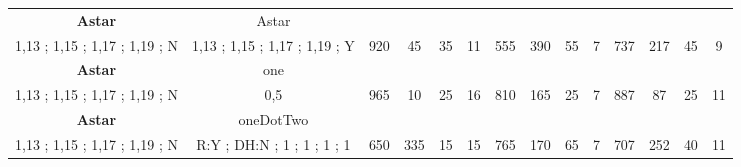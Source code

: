 \begin{table}[]
{\begin{tabular}{|c|c|c|c|c|c|c|c|c|c|c|c|c|c|}
\cellcolor{blue!15}\textbf{Astar} & Astar& {\color[HTML]{00009B} } & {\color[HTML]{9A0000} } & {\color[HTML]{009901} } &  & {\color[HTML]{00009B} } & {\color[HTML]{9A0000} } & {\color[HTML]{009901} } &  & {\color[HTML]{00009B} } & {\color[HTML]{9A0000} } & {\color[HTML]{009901} } &  \\ 
\cellcolor{ blue!15}1,13 ; 1,15 ; 1,17 ; 1,19 ; N & 1,13 ; 1,15 ; 1,17 ; 1,19 ; Y & \multirow{-2}{*}{{\color[HTML]{00009B} 920}} & \multirow{-2}{*}{{\color[HTML]{9A0000} 45}} & \multirow{-2}{*}{{\color[HTML]{009901} 35}} & \multirow{-2}{*}{11} & \multirow{-2}{*}{{\color[HTML]{00009B} 555}} & \multirow{-2}{*}{{\color[HTML]{9A0000} 390}} & \multirow{-2}{*}{{\color[HTML]{009901} 55}} & \multirow{-2}{*}{7} & \multirow{-2}{*}{{\color[HTML]{00009B} 737}} & \multirow{-2}{*}{{\color[HTML]{9A0000} 217}} & \multirow{-2}{*}{{\color[HTML]{009901} 45}} & \multirow{-2}{*}{9} \\ \hline

\cellcolor{blue!15}\textbf{Astar} & one& {\color[HTML]{00009B} } & {\color[HTML]{9A0000} } & {\color[HTML]{009901} } &  & {\color[HTML]{00009B} } & {\color[HTML]{9A0000} } & {\color[HTML]{009901} } &  & {\color[HTML]{00009B} } & {\color[HTML]{9A0000} } & {\color[HTML]{009901} } &  \\ 
\cellcolor{ blue!15}1,13 ; 1,15 ; 1,17 ; 1,19 ; N & 0,5 & \multirow{-2}{*}{{\color[HTML]{00009B} 965}} & \multirow{-2}{*}{{\color[HTML]{9A0000} 10}} & \multirow{-2}{*}{{\color[HTML]{009901} 25}} & \multirow{-2}{*}{16} & \multirow{-2}{*}{{\color[HTML]{00009B} 810}} & \multirow{-2}{*}{{\color[HTML]{9A0000} 165}} & \multirow{-2}{*}{{\color[HTML]{009901} 25}} & \multirow{-2}{*}{7} & \multirow{-2}{*}{{\color[HTML]{00009B} 887}} & \multirow{-2}{*}{{\color[HTML]{9A0000} 87}} & \multirow{-2}{*}{{\color[HTML]{009901} 25}} & \multirow{-2}{*}{11} \\ \hline

\cellcolor{blue!15}\textbf{Astar} & oneDotTwo& {\color[HTML]{00009B} } & {\color[HTML]{9A0000} } & {\color[HTML]{009901} } &  & {\color[HTML]{00009B} } & {\color[HTML]{9A0000} } & {\color[HTML]{009901} } &  & {\color[HTML]{00009B} } & {\color[HTML]{9A0000} } & {\color[HTML]{009901} } &  \\ 
\cellcolor{ blue!15}1,13 ; 1,15 ; 1,17 ; 1,19 ; N & R:Y ; DH:N ; 1 ; 1 ; 1 ; 1 & \multirow{-2}{*}{{\color[HTML]{00009B} 650}} & \multirow{-2}{*}{{\color[HTML]{9A0000} 335}} & \multirow{-2}{*}{{\color[HTML]{009901} 15}} & \multirow{-2}{*}{15} & \multirow{-2}{*}{{\color[HTML]{00009B} 765}} & \multirow{-2}{*}{{\color[HTML]{9A0000} 170}} & \multirow{-2}{*}{{\color[HTML]{009901} 65}} & \multirow{-2}{*}{7} & \multirow{-2}{*}{{\color[HTML]{00009B} 707}} & \multirow{-2}{*}{{\color[HTML]{9A0000} 252}} & \multirow{-2}{*}{{\color[HTML]{009901} 40}} & \multirow{-2}{*}{11} \\ \hline


\end{tabular}}
\end{table}
